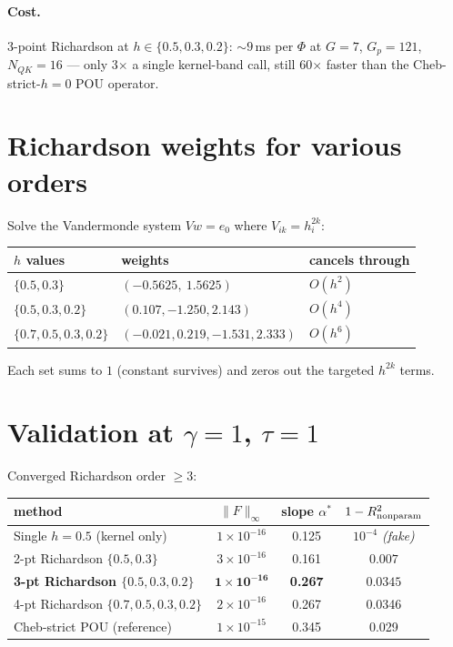 \documentclass[11pt]{article}
\begin{document}
\paragraph{Cost.} 3-point Richardson at $h \in \{0.5, 0.3, 0.2\}$:
$\sim 9$\,ms per $\Phi$ at $G{=}7$, $G_p{=}121$, $N_{QK}{=}16$ --- only
3$\times$ a single kernel-band call, still 60$\times$ faster than the
Cheb-strict-$h{=}0$ POU operator.

\section{Richardson weights for various orders}

Solve the Vandermonde system $V w = e_0$ where $V_{ik} = h_i^{2k}$:

\begin{center}
\begin{tabular}{lll}
\toprule
$h$ values & weights & cancels through \\
\midrule
$\{0.5, 0.3\}$       & $(-0.5625,\ 1.5625)$ & $O(h^2)$ \\
$\{0.5, 0.3, 0.2\}$  & $(0.107, -1.250, 2.143)$ & $O(h^4)$ \\
$\{0.7, 0.5, 0.3, 0.2\}$ & $(-0.021, 0.219, -1.531, 2.333)$ & $O(h^6)$ \\
\bottomrule
\end{tabular}
\end{center}

Each set sums to $1$ (constant survives) and zeros out the targeted
$h^{2k}$ terms.

\section{Validation at $\gamma=1$, $\tau=1$}

Converged Richardson order $\geq 3$:

\begin{center}
\begin{tabular}{lccc}
\toprule
method & $\|F\|_\infty$ & slope $\alpha^*$ & $1-R^2_{\rm nonparam}$ \\
\midrule
Single $h{=}0.5$ (kernel only) & $1\!\times\!10^{-16}$ & 0.125 & $10^{-4}$ \emph{(fake)} \\
2-pt Richardson $\{0.5, 0.3\}$ & $3\!\times\!10^{-16}$ & 0.161 & $0.007$ \\
\textbf{3-pt Richardson $\{0.5, 0.3, 0.2\}$} & $\mathbf{1\!\times\!10^{-16}}$ & \textbf{0.267} & $\mathbf{0.0345}$ \\
4-pt Richardson $\{0.7, 0.5, 0.3, 0.2\}$ & $2\!\times\!10^{-16}$ & 0.267 & 0.0346 \\
\midrule
Cheb-strict POU (reference) & $1\!\times\!10^{-15}$ & 0.345 & 0.029 \\
\bottomrule
\end{tabular}
\end{center}
\end{document}
